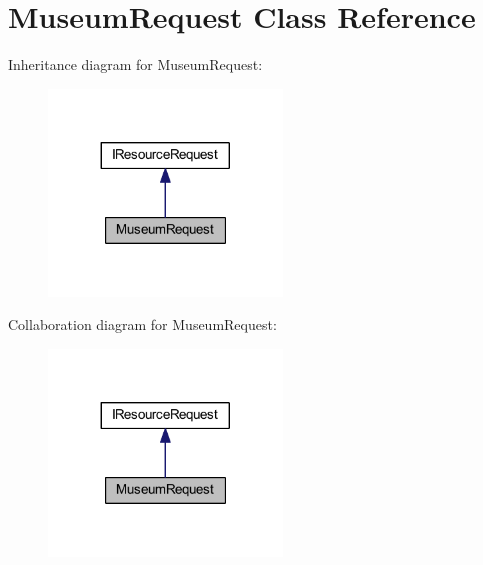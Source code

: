 \hypertarget{class_museum_request}{}\section{Museum\+Request Class Reference}
\label{class_museum_request}


Inheritance diagram for Museum\+Request\+:
\nopagebreak
\begin{figure}[H]
\begin{center}
\leavevmode
\includegraphics[width=176pt]{class_museum_request__inherit__graph}
\end{center}
\end{figure}


Collaboration diagram for Museum\+Request\+:
\nopagebreak
\begin{figure}[H]
\begin{center}
\leavevmode
\includegraphics[width=176pt]{class_museum_request__coll__graph}
\end{center}
\end{figure}
